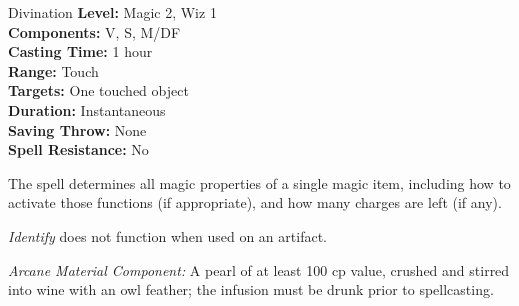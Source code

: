 {Divination}
{
	\textbf{Level:}
	Magic 2, Wiz 1\\
	\textbf{Components:}
	V, S, M/DF\\
	\textbf{Casting Time:}
	1 hour\\
	\textbf{Range:}
	Touch\\
	\textbf{Targets:}
	One touched object\\
	\textbf{Duration:}
	Instantaneous\\
	\textbf{Saving Throw:}
	None\\
	\textbf{Spell Resistance:}
	No\\
}
{
	The spell determines all magic properties of a single magic item, including how to activate those functions (if appropriate), and how many charges are left (if any).

	\emph{Identify} does not function when used on an artifact.

	\textit{Arcane Material Component:}
	A pearl of at least 100 cp value, crushed and stirred into wine with an owl feather; the infusion must be drunk prior to spellcasting.

}
